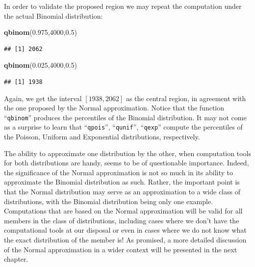 \documentclass[
]{krantz}
\makeatletter
\newenvironment{Shaded}{\begin{snugshade}}{\end{snugshade}}
\newcommand{\DecValTok}[1]{\textcolor[rgb]{0.00,0.00,0.81}{#1}}
\newcommand{\FloatTok}[1]{\textcolor[rgb]{0.00,0.00,0.81}{#1}}
\newcommand{\KeywordTok}[1]{\textcolor[rgb]{0.13,0.29,0.53}{\textbf{#1}}}
\newcommand{\NormalTok}[1]{#1}
\newenvironment{kframe}{%
\medskip{}
\setlength{\fboxsep}{.8em}
 \def\at@end@of@kframe{}%
 \ifinner\ifhmode%
  \def\at@end@of@kframe{\end{minipage}}%
  \begin{minipage}{\columnwidth}%
 \fi\fi%
 \def\FrameCommand##1{\hskip\@totalleftmargin \hskip-\fboxsep
 \colorbox{shadecolor}{##1}\hskip-\fboxsep
     \hskip-\linewidth \hskip-\@totalleftmargin \hskip\columnwidth}%
 \MakeFramed {\advance\hsize-\width
   \@totalleftmargin\z@ \linewidth\hsize
   \@setminipage}}%
 {\par\unskip\endMakeFramed%
 \at@end@of@kframe}
\renewenvironment{Shaded}{\begin{kframe}}{\end{kframe}}
\theoremstyle{definition}
\theoremstyle{definition}
\theoremstyle{definition}
\theoremstyle{remark}
\makeatother
\begin{document}
In order to validate the proposed region we may repeat the computation
under the actual Binomial distribution:

\begin{Shaded}
\begin{Highlighting}[]
\KeywordTok{qbinom}\NormalTok{(}\FloatTok{0.975}\NormalTok{,}\DecValTok{4000}\NormalTok{,}\FloatTok{0.5}\NormalTok{)}
\end{Highlighting}
\end{Shaded}

\begin{verbatim}
## [1] 2062
\end{verbatim}

\begin{Shaded}
\begin{Highlighting}[]
\KeywordTok{qbinom}\NormalTok{(}\FloatTok{0.025}\NormalTok{,}\DecValTok{4000}\NormalTok{,}\FloatTok{0.5}\NormalTok{)}
\end{Highlighting}
\end{Shaded}

\begin{verbatim}
## [1] 1938
\end{verbatim}

Again, we get the interval \([1938,2062]\) as the central region, in
agreement with the one proposed by the Normal approximation. Notice that
the function ``\texttt{qbinom}'' produces the percentiles of the Binomial
distribution. It may not come as a surprise to learn that ``\texttt{qpois}'',
``\texttt{qunif}'', ``\texttt{qexp}'' compute the percentiles of the Poisson, Uniform and
Exponential distributions, respectively.

The ability to approximate one distribution by the other, when
computation tools for both distributions are handy, seems to be of
questionable importance. Indeed, the significance of the Normal
approximation is not so much in its ability to approximate the Binomial
distribution as such. Rather, the important point is that the Normal
distribution may serve as an approximation to a wide class of
distributions, with the Binomial distribution being only one example.
Computations that are based on the Normal approximation will be valid
for all members in the class of distributions, including cases where we
don't have the computational tools at our disposal or even in cases
where we do not know what the exact distribution of the member is! As
promised, a more detailed discussion of the Normal approximation in a
wider context will be presented in the next chapter.
\end{document}
